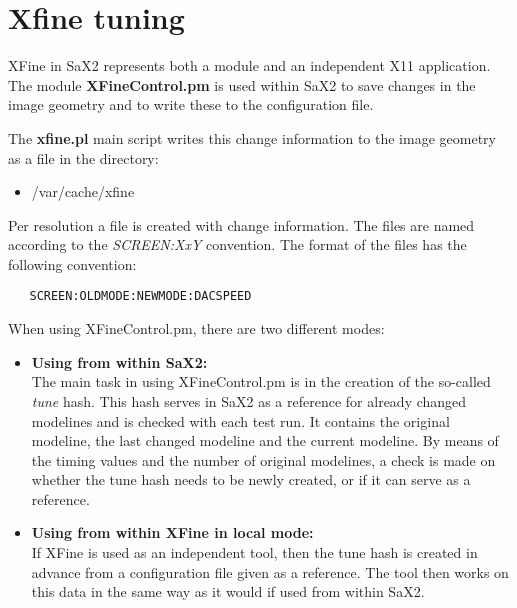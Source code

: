 \chapter{Xfine tuning}
\label{cha:xfi}
\minitoc
XFine  in SaX2 represents both a module and an independent X11
application. The module \textbf{XFineControl.pm} is used within SaX2 to save
changes in the image geometry and to write these to the configuration file.

The \textbf{xfine.pl} main script writes this change information to the image
geometry as a file in the directory:
\begin{itemize}
\item /var/cache/xfine
\end{itemize}
Per resolution a file is created with change information. The files are named
according to the \textit{SCREEN:XxY} convention.
The format of the files has the following convention:
\begin{verbatim}
   SCREEN:OLDMODE:NEWMODE:DACSPEED
\end{verbatim}

When using XFineControl.pm, there are two different modes:
\begin{itemize}
\item \textbf{Using from within SaX2:}\\
      The main task in using XFineControl.pm is in the creation of the
      so-called \textit{tune} hash. This hash serves in SaX2 as a reference
      for already changed modelines and is checked with each test run. It
      contains the original modeline, the last changed modeline and the
      current modeline. By means of the timing values and the number of
      original modelines, a check is made on whether the tune hash needs to be
      newly created, or if it can serve as a reference. 

\item \textbf{Using from within XFine in local mode:}\\
      If XFine is used as an independent tool, then the tune hash is created
      in advance from a configuration file given as a reference. The tool then
      works on this data in the same way as it would if used from within SaX2.
\end{itemize}

